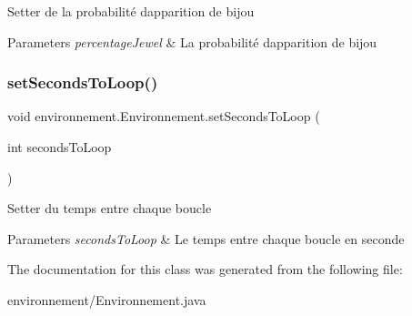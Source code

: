 Setter de la probabilité d\textquotesingle{}apparition de bijou 
\begin{DoxyParams}{Parameters}
{\em percentage\+Jewel} & La probabilité d\textquotesingle{}apparition de bijou \\
\hline
\end{DoxyParams}
\hypertarget{classenvironnement_1_1_environnement_a7d2dde8f8108918651f8f8f8a4bfcdf5}{}\label{classenvironnement_1_1_environnement_a7d2dde8f8108918651f8f8f8a4bfcdf5} 
\subsubsection{\texorpdfstring{set\+Seconds\+To\+Loop()}{setSecondsToLoop()}}
{\footnotesize\ttfamily void environnement.\+Environnement.\+set\+Seconds\+To\+Loop (\begin{DoxyParamCaption}\item[{int}]{seconds\+To\+Loop }\end{DoxyParamCaption})}

Setter du temps entre chaque boucle 
\begin{DoxyParams}{Parameters}
{\em seconds\+To\+Loop} & Le temps entre chaque boucle en seconde \\
\hline
\end{DoxyParams}


The documentation for this class was generated from the following file\+:\begin{DoxyCompactItemize}
\item 
environnement/Environnement.\+java\end{DoxyCompactItemize}
